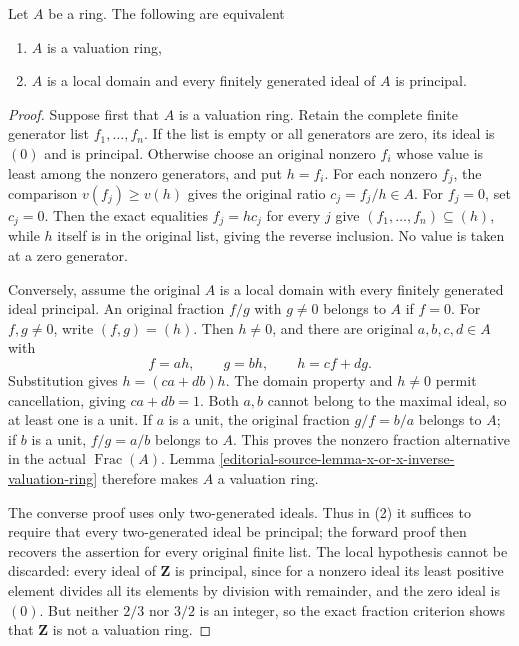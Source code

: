 \begin{lemma}
\label{editorial-source-lemma-characterize-valuation-ring}
Let $A$ be a ring. The following are equivalent
\begin{enumerate}
\item $A$ is a valuation ring,
\item $A$ is a local domain and every finitely generated
ideal of $A$ is principal.
\end{enumerate}
\end{lemma}

\begin{proof}
Suppose first that $A$ is
a valuation ring. Retain
the complete finite generator
list $f_1,\ldots,f_n$.
If the list is empty
or all generators are zero,
its ideal is $(0)$ and
is principal. Otherwise choose
an original nonzero $f_i$
whose value is least among
the nonzero generators, and
put $h=f_i$. For each
nonzero $f_j$, the comparison
$v(f_j)\geq v(h)$ gives
the original ratio $c_j=f_j/h\in A$.
For $f_j=0$, set $c_j=0$.
Then the exact equalities
$f_j=hc_j$ for every $j$
give $(f_1,\ldots,f_n)\subseteq(h)$,
while $h$ itself is in
the original list, giving
the reverse inclusion.
No value is taken at
a zero generator.

Conversely, assume the original
$A$ is a local domain
with every finitely generated
ideal principal. An original
fraction $f/g$ with $g\neq0$
belongs to $A$ if $f=0$.
For $f,g\neq0$, write
$(f,g)=(h)$. Then $h\neq0$,
and there are original
$a,b,c,d\in A$ with
$$
f=ah,\qquad g=bh,\qquad h=cf+dg.
$$
Substitution gives
$h=(ca+db)h$. The domain
property and $h\neq0$ permit
cancellation, giving $ca+db=1$.
Both $a,b$ cannot belong
to the maximal ideal,
so at least one is a
unit. If $a$ is a
unit, the original fraction
$g/f=b/a$ belongs to $A$;
if $b$ is a unit,
$f/g=a/b$ belongs to $A$.
This proves the nonzero
fraction alternative in the
actual $\operatorname{Frac}(A)$.
Lemma
\ref{editorial-source-lemma-x-or-x-inverse-valuation-ring}
therefore makes $A$ a
valuation ring.

The converse proof uses
only two-generated ideals.
Thus in (2) it suffices
to require that every
two-generated ideal be principal;
the forward proof then
recovers the assertion for
every original finite list.
The local hypothesis cannot
be discarded: every ideal
of $\mathbf Z$ is principal,
since for a nonzero ideal
its least positive element
divides all its elements
by division with remainder,
and the zero ideal is
$(0)$. But neither $2/3$
nor $3/2$ is an integer,
so the exact fraction
criterion shows that $\mathbf Z$
is not a valuation ring.
\end{proof}

